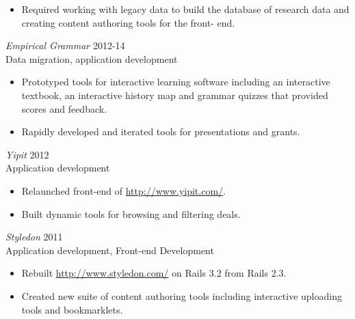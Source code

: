 \documentclass[line,margin]{res}
\begin{document}
\begin{resume}
\begin{itemize}
        \item
              Required working with legacy data to build the database of
              research data and creating content authoring tools for the front-
              end.
    \end{itemize}

    \begin{samepage}
        {\sl Empirical Grammar}
        \hfill 2012-14 \\
        Data migration, application development
        \begin{itemize} \itemsep -2pt
            \item
                  Prototyped tools for interactive learning software including an
                  interactive textbook, an interactive history map and grammar
                  quizzes that provided scores and feedback.

            \item
                  Rapidly developed and iterated tools for presentations and grants.
        \end{itemize}
    \end{samepage}


    \begin{samepage}
        {\sl Yipit}
        \hfill 2012 \\
        Application development
        \begin{itemize} \itemsep -2pt
            \item
                  Relaunched front-end of \url{http://www.yipit.com/}.

            \item
                  Built dynamic tools for browsing and filtering deals.
        \end{itemize}
    \end{samepage}

    {\sl Styledon}
    \hfill 2011 \\
    Application development, Front-end Development
    \begin{itemize} \itemsep -2pt
        \item
              Rebuilt \url{http://www.styledon.com/} on Rails 3.2 from Rails
              2.3.

        \item
              Created new suite of content authoring tools including interactive
              uploading tools and bookmarklets.
    \end{itemize}


\end{resume}
\end{document}
